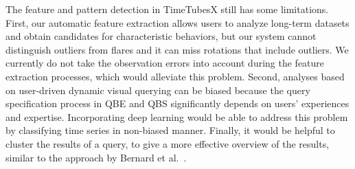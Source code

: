 The feature and pattern detection in TimeTubesX still has some limitations.
%
%
First, our automatic feature extraction allows users to analyze long-term datasets and obtain candidates for characteristic behaviors, but our system cannot distinguish outliers from flares and it can miss rotations that include outliers.
We currently do not take the observation errors into account during the feature extraction processes, which would alleviate this problem.
%
Second, analyses based on user-driven dynamic visual querying can be biased because the query specification process in QBE and QBS significantly depends on users' experiences and expertise.
Incorporating deep learning would be able to address this problem by classifying time series in non-biased manner.
Finally, it would be helpful to cluster the results of a query, to give a more effective overview of the results, similar to the approach by Bernard et al.~\cite{Bernard2010}.



